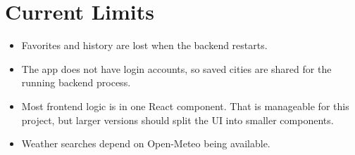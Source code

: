 \documentclass[11pt]{article}
\begin{document}
\section{Current Limits}
\begin{itemize}
\item Favorites and history are lost when the backend restarts.
\item The app does not have login accounts, so saved cities are shared for the running backend process.
\item Most frontend logic is in one React component. That is manageable for this project, but larger versions should split the UI into smaller components.
\item Weather searches depend on Open-Meteo being available.
\end{itemize}
\end{document}
